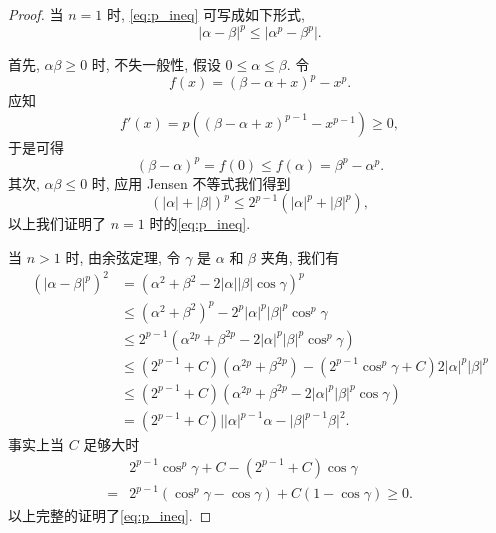 \documentclass[oneside,longtitle]{LZUthesis}
\numberwithin{equation}{chapter}
\newcommand*\abs[1]{\lvert#1\rvert}
\begin{document}
\begin{proof}
	当 $n = 1$ 时, \cref{eq:p_ineq} 可写成如下形式,
	\begin{equation*}
		\abs{\alpha-\beta}^p \leq \abs{\alpha^p - \beta^p}.
	\end{equation*}

	首先, $\alpha \beta \geq 0$ 时, 
	不失一般性, 假设 $0 \leq \alpha \leq \beta$. 令
	\begin{equation*}
		f(x) = (\beta-\alpha+x)^p - x^p.
	\end{equation*}
	应知
	\begin{equation*}
		f'(x) = p\left((\beta-\alpha+x)^{p-1} - x^{p-1}\right) \geq 0,
	\end{equation*}
	于是可得
	\begin{equation*}
		\left(\beta-\alpha\right)^p = f(0) \leq f(\alpha) = \beta^p - \alpha^p.
	\end{equation*}
	其次, $\alpha \beta \leq 0$ 时,
	应用 Jensen 不等式我们得到
	\begin{equation*}
		\left(\abs{\alpha}+\abs{\beta}\right)^p \leq 2^{p-1}\left(\abs{\alpha}^p + \abs{\beta}^p\right),
	\end{equation*}
	以上我们证明了 $n = 1$ 时的\cref{eq:p_ineq}.
	
	当 $n > 1$ 时, 由余弦定理, 令 $\gamma$ 是 $\alpha$ 和 $\beta$ 夹角, 我们有
	\begin{equation*}
		\begin{split}
			\left(\abs{\alpha-\beta}^p\right)^2
			&= \left(\alpha^2 + \beta^2 - 2 \abs{\alpha}\abs{\beta}\cos{\gamma}\right)^p\\
			&\leq \left(\alpha^2+\beta^2\right)^p - 2^p\abs{\alpha}^p\abs{\beta}^p\cos^p{\gamma}\\
			&\leq 2^{p-1}\left(\alpha^{2p} + \beta^{2p} - 2\abs{\alpha}^p\abs{\beta}^p\cos^p{\gamma}\right)\\
			&\leq \left(2^{p-1}+C\right)\left(\alpha^{2p} + \beta^{2p}\right)
			- \left(2^{p-1}\cos^p{\gamma}+C\right)2\abs{\alpha}^p\abs{\beta}^p\\
			&\leq \left(2^{p-1}+C\right)\left(\alpha^{2p} + \beta^{2p} - 2\abs{\alpha}^p\abs{\beta}^p\cos{\gamma}\right)\\
			&= \left(2^{p-1}+C\right)\abs{\abs{\alpha}^{p-1}\alpha - \abs{\beta}^{p-1}\beta}^2.
		\end{split}
	\end{equation*}
	事实上当 $C$ 足够大时
	\begin{equation*}
		\begin{split}
			& 2^{p-1}\cos^p{\gamma} + C - \left(2^{p-1}+C\right)\cos{\gamma}\\
			={} & 2^{p-1}\left(\cos^p{\gamma} - \cos{\gamma}\right) + C\left(1-\cos{\gamma}\right)
			\geq 0.
		\end{split}
	\end{equation*}
	以上完整的证明了\cref{eq:p_ineq}.
\end{proof}
\end{document}
